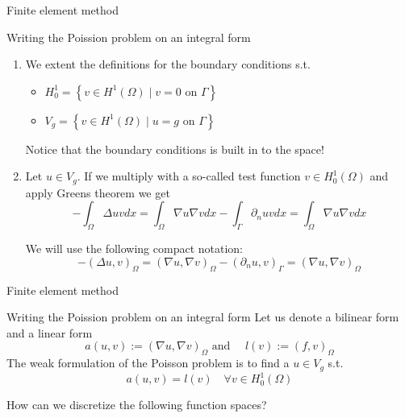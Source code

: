 \begin{frame}{Finite element method}
        \begin{block}{Writing the Poission problem on an integral form   }
            \begin{enumerate}
                \item We extent the definitions for the boundary conditions s.t.
                    \begin{itemize}
                        \item $H^{1}_{0} = \left\{ v \in H^{1 }( \Omega )   \mid  v = 0 \text{ on } \Gamma   \right\} $
                        \item  $V_{g} = \left\{ v \in H^{1 }( \Omega )   \mid  u = g \text{ on }  \Gamma   \right\} $
                    \end{itemize}
                    Notice that the boundary conditions is built in to the space!
                \item Let $u \in V_{g}$. If we multiply with a so-called test function $v \in H^{1}_{0}( \Omega ) $ and apply Greens theorem we get
                    \[
                - \int_\Omega  \Delta u v dx  = \int_\Omega  \nabla u \nabla v dx - \int_\Gamma \partial _{n} u v dx  =  \int_\Omega  \nabla u \nabla v dx
                    \]

                    We will use the following compact notation:
                    \[
                -( \Delta u, v) _{\Omega } = ( \nabla u, \nabla v)_{\Omega} - (\partial _{n} u, v )_{\Gamma }  =  ( \nabla u, \nabla v)_{\Omega}
                \]

            \end{enumerate}
        \end{block}
\end{frame}

\begin{frame}{Finite element method}
        \begin{block}{Writing the Poission problem on an integral form  }
             Let us denote a bilinear form and a linear form \[
            a( u,v)  := ( \nabla u,\nabla v)_{\Omega } \text{ and }  \quad l ( v) := ( f,v) _{\Omega  }
            \]
            The weak formulation of the Poisson problem is to find a $u \in V_{g}$ s.t. \[
            a( u,v) = l ( v) \quad  \forall v  \in  H^{1}_{0}( \Omega  )
            \]

        \end{block}

        How can we discretize the following function spaces?
\end{frame}

